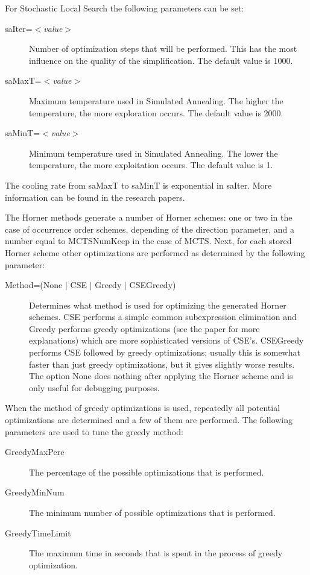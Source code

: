 For Stochastic Local Search the following parameters can be set:
\begin{description}
\item[saIter=$<$\emph{value}$>$] Number of optimization steps that will be performed. This has the most influence on the quality of the simplification. The default value is 1000.
\item[saMaxT=$<$\emph{value}$>$] Maximum temperature used in Simulated Annealing. The higher the temperature,
the more exploration occurs. The default value is 2000.
\item[saMinT=$<$\emph{value}$>$] Minimum temperature used in Simulated Annealing. The lower the temperature,
the more exploitation occurs. The default value is 1.
\end{description}
The cooling rate from saMaxT to saMinT is exponential in saIter. More information can be
found in the research papers.

The Horner methods generate a number of Horner schemes: one or two in
the case of occurrence order schemes, depending of the direction
parameter, and a number equal to MCTSNumKeep in the case of
MCTS. Next, for each stored Horner scheme other optimizations are
performed as determined by the following parameter:

\begin{description}
\item[Method=(None $|$ CSE $|$ Greedy $|$ CSEGreedy)] Determines what
method is used for optimizing the generated Horner schemes. 
CSE performs a simple 
common subexpression elimination and Greedy performs greedy 
optimizations (see the paper for more 
explanations) which are more sophisticated versions of CSE's. CSEGreedy 
performs CSE followed by greedy optimizations; usually this is somewhat 
faster than just greedy optimizations, but it gives slightly worse results. 
The option None does nothing after applying the Horner scheme and is only 
useful for debugging purposes.
\end{description}

When the method of greedy optimizations is used, repeatedly all
potential optimizations are determined and a few of them are performed. The 
following parameters are used to tune the greedy method:
\begin{description}
\item[GreedyMaxPerc] The percentage of the possible optimizations that is
  performed.
\item[GreedyMinNum] The minimum number of possible optimizations that
  is performed.
\item[GreedyTimeLimit] The maximum time in seconds that is spent in
  the process of greedy optimization.
\end{description}


